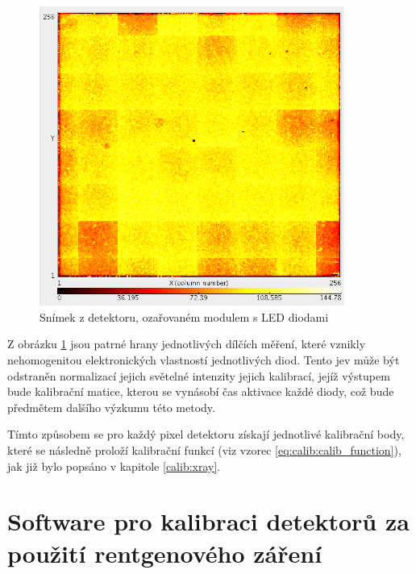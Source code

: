 \begin{figure}[th]
	\begin{center}
		\includegraphics[width=10cm]{figures/led_calib_frame.png}
		\caption{Snímek z detektoru, ozařovaném modulem s LED diodami}
		\label{fig:calib:led_frame}
	\end{center}
\end{figure}

Z obrázku \ref{fig:calib:led_frame} jsou patrné hrany jednotlivých dílčích měření, které vznikly nehomogenitou elektronických vlastností jednotlivých diod. Tento jev může být odstraněn normalizací jejich světelné intenzity jejich kalibrací, jejíž výstupem bude kalibrační matice, kterou se vynásobí čas aktivace každé diody, což bude předmětem dalšího výzkumu této metody.

Tímto způsobem se pro každý pixel detektoru získají jednotlivé kalibrační body, které se následně proloží kalibrační funkcí (viz vzorec \ref{eq:calib:calib_function}), jak již bylo popsáno v kapitole \ref{calib:xray}.


\section{Software pro kalibraci detektorů za použití rentgenového záření}\label{calib:sw}



